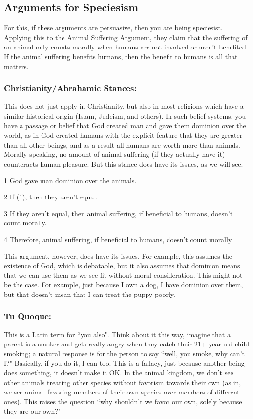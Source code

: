 \subsection{Arguments for Speciesism}

For this, if these arguments are persuasive, then you are being speciesist. Applying this to the Animal Suffering Argument, they claim that the suffering of an animal only counts morally when humans are not involved or aren't benefited. If the animal suffering benefits humans, then the benefit to humans is all that matters. 
\subsubsection{Christianity/Abrahamic Stances:}

This does not just apply in Christianity, but also in most religions which have a similar historical origin (Islam, Judeism, and others). In such belief systems, you have a passage or belief that God created man and gave them dominion over the world, as in God created humans with the explicit feature that they are greater than all other beings, and as a result all humans are worth more than animals. Morally speaking, no amount of animal suffering (if they actually have it) counteracts human pleasure. But this stance does have its issues, as we will see.
\begin{earg}
    \item[1] God gave man dominion over the animals.
    \item[2] If (1), then they aren't equal.
    \item[3] If they aren't equal, then animal suffering, if beneficial to humans, doesn't count morally.
    \item[4] Therefore, animal suffering, if beneficial to humans, doesn't count morally. 
\end{earg}
This argument, however, does have its issues. For example, this assumes the existence of God, which is debatable, but it also assumes that dominion means that we can use them as we see fit without moral consideration. This might not be the case. For example, just because I own a dog, I have dominion over them, but that doesn't mean that I can treat the puppy poorly.  
\subsubsection{Tu Quoque:}

This is a Latin term for ``you also". Think about it this way, imagine that a parent is a smoker and gets really angry when they catch their 21+ year old child smoking; a natural response is for the person to say ``well, you smoke, why can't I?" Basically, if you do it, I can too. This is a fallacy, just because another being does something, it doesn't make it OK. In the animal kingdom, we don't see other animals treating other species without favorism towards their own (as in, we see animal favoring members of their own species over members of different ones). This raises the question ``why shouldn't we favor our own, solely because they are our own?" 

